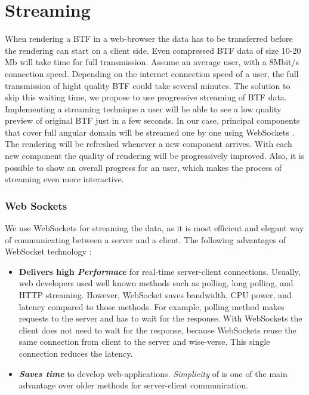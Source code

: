\chapter{Streaming}
\label{chapter:streaming}

When rendering a BTF in a web-browser the data has to be transferred before the rendering can start on a client side.
Even  compressed BTF data of size 10-20 Mb will take time for full transmission.
Assume an average user, with a 8Mbit/s connection speed.
Depending on the internet connection speed of a user, the full transmission of hight quality BTF could take several minutes.
 The solution to skip this waiting time, we propose to use progressive streaming of BTF data.
Implementing a streaming technique a user will be able to see a low quality preview of original BTF just in a few seconds. 
In our case, principal components that cover full angular domain will be streamed one by one using WebSockets \cite{websockets}.
The rendering will be refreshed whenever a new component arrives.
With each new component the quality of rendering will be progressively improved.
 Also, it is possible to show an overall progress for an user, which makes the process of streaming even more interactive.
\subsection{Web Sockets}
\label{chapter:sockets}

We use WebSockets for streaming the data, as it is most efficient and elegant way of communicating between a server and a client.
The following advantages of WebSocket technology \cite[Ch.\ 1]{websockets}:

\begin{itemize}
  \item \textbf{Delivers high \emph{Performace}}  for real-time server-client connections. 
  Usually, web developers used well known methods such as polling, long polling, and HTTP streaming. However, WebSocket saves bandwidth, CPU power, and latency compared to those methods.
  For example, polling method makes requests to the server and has to wait for the response.
  With WebSockets the client does not need to wait for the response, because WebSockets reuse the same connection from client to the server and wise-verse.
  This single connection reduces the latency.

  \item \textbf{\emph{Saves time}} to develop web-applications. \emph{Simplicity} of is one of the main advantage over older methods for server-client communication.
  
\end{itemize}

